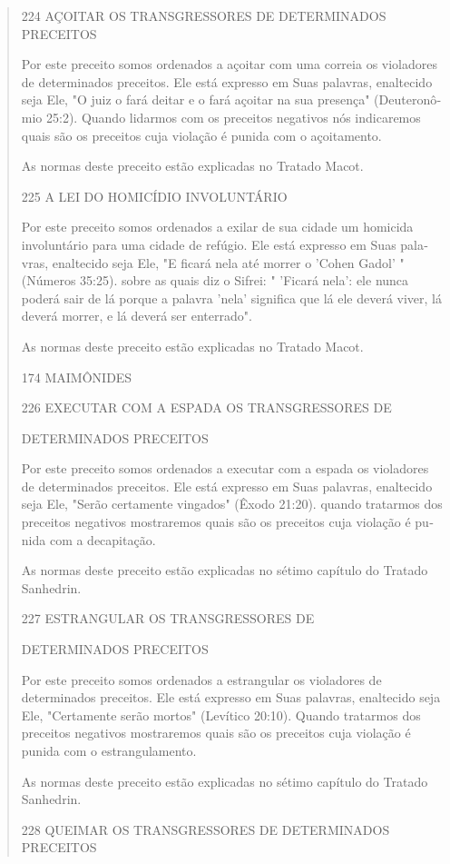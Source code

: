 \begin{quote}
224 AÇOITAR OS TRANSGRESSORES DE DETERMINADOS PRECEITOS

Por este preceito somos ordenados a açoitar com uma correia os
vio­ladores de determinados preceitos. Ele está expresso em Suas
palavras, enalte­cido seja Ele, "O juiz o fará deitar e o fará açoitar
na sua presença" (Deuteronô­mio 25:2). Quando lidarmos com os preceitos
negativos nós indicaremos quais são os preceitos cuja violação é punida
com o açoitamento.

As normas deste preceito estão explicadas no Tratado Macot.

225 A LEI DO HOMICÍDIO INVOLUNTÁRIO

Por este preceito somos ordenados a exilar de sua cidade um homi­cida
involuntário para uma cidade de refúgio. Ele está expresso em Suas
pala­vras, enaltecido seja Ele, "E ficará nela até morrer o 'Cohen
Gadol' " (Números 35:25). sobre as quais diz o Sifrei: " 'Ficará nela':
ele nunca poderá sair de lá porque a palavra 'nela' significa que lá ele
deverá viver, lá deverá morrer, e lá deverá ser enterrado".

As normas deste preceito estão explicadas no Tratado Macot.

174 MAIMÔNIDES

226 EXECUTAR COM A ESPADA OS TRANSGRESSORES DE

DETERMINADOS PRECEITOS

Por este preceito somos ordenados a executar com a espada os vio­ladores
de determinados preceitos. Ele está expresso em Suas palavras,
enalte­cido seja Ele, "Serão certamente vingados" (Êxodo 21:20). quando
tratarmos dos preceitos negativos mostraremos quais são os preceitos
cuja violação é pu­nida com a decapitação.

As normas deste preceito estão explicadas no sétimo capítulo do Tra­tado
Sanhedrin.

227 ESTRANGULAR OS TRANSGRESSORES DE

DETERMINADOS PRECEITOS

Por este preceito somos ordenados a estrangular os violadores de
determinados preceitos. Ele está expresso em Suas palavras, enaltecido
seja Ele, "Certamente serão mortos" (Levítico 20:10). Quando tratarmos
dos preceitos negativos mostraremos quais são os preceitos cuja violação
é punida com o estrangulamento.

As normas deste preceito estão explicadas no sétimo capítulo do Tra­tado
Sanhedrin.

228 QUEIMAR OS TRANSGRESSORES DE DETERMINADOS PRECEITOS


\end{quote}
